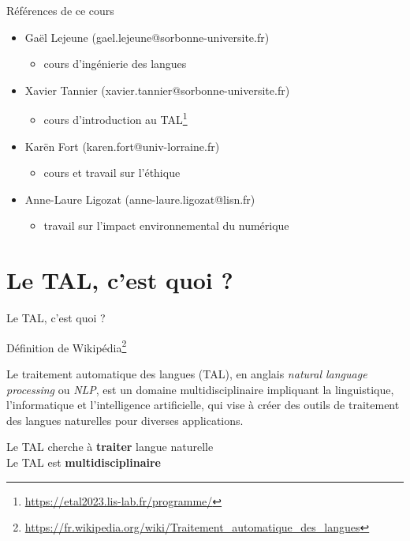 \documentclass[serif, aspectratio=169]{beamer}
\begin{document}
\begin{frame}{Références de ce cours}
    \begin{itemize}
        \item Gaël Lejeune (gael.lejeune@sorbonne-universite.fr)
        \begin{itemize}
            \item cours d'ingénierie des langues
        \end{itemize}
        \vspace{10pt}
        \item Xavier Tannier (xavier.tannier@sorbonne-universite.fr)
        \begin{itemize}
            \item cours d'introduction au TAL\footnote{\url{https://etal2023.lis-lab.fr/programme/}}
        \end{itemize}
        \vspace{10pt}
        \item Karën Fort (karen.fort@univ-lorraine.fr)
        \begin{itemize}
            \item cours et travail sur l'éthique
        \end{itemize}
        \vspace{10pt}
        \item Anne-Laure Ligozat (anne-laure.ligozat@lisn.fr)
        \begin{itemize}
            \item travail sur l'impact environnemental du numérique
        \end{itemize}
    \end{itemize}
\end{frame}

\section{Le TAL, c'est quoi ?}

\begin{frame}{Le TAL, c'est quoi ?}
    \begin{block}{Définition de Wikipédia\footnote{\url{https://fr.wikipedia.org/wiki/Traitement_automatique_des_langues}}}
        \begin{tcolorbox}
            Le traitement automatique des langues (TAL), en anglais \textit{natural language processing} ou \textit{NLP}, est un domaine multidisciplinaire impliquant la linguistique, l'informatique et l'intelligence artificielle, qui vise à créer des outils de traitement des langues naturelles pour diverses applications.
        \end{tcolorbox}
    \end{block}
    \pause
    \begin{center}
        \Large Le TAL cherche à \textbf{traiter}  langue\only<3->{s} naturelle \\
        Le TAL est \textbf{multidisciplinaire}
    \end{center}
\end{frame}
\end{document}
